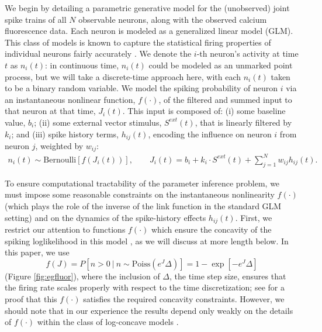 \documentclass[aoas,preprint]{imsart}
\newcommand{\w}{w}
\begin{document}
We begin by detailing a parametric generative model for the
(unobserved) joint spike trains of all $N$ observable neurons, along
with the observed calcium fluorescence data. Each neuron is modeled as
a generalized linear model (GLM). This class of models is known to
capture the statistical firing properties of individual neurons fairly
accurately
\cite{BRIL88,CSK88,BRIL92,PG00,PAN03d,PAN04c,Rigat06,TRUC05,NYK06,KP06,PILL07,Vidne08,Stevenson2009}. We
denote the $i$-th neuron's activity at time $t$ as $n_i(t)$: in
continuous time, $n_i(t)$ could be modeled as an unmarked point
process, but we will take a discrete-time approach here, with each
$n_i(t)$ taken to be a binary random variable. We model the spiking
probability of neuron $i$ via an instantaneous nonlinear function,
$f(\cdot)$, of the filtered and summed input to that neuron at that
time, $J_i(t)$. This input is composed of: (i) some baseline value,
$b_i$; (ii) some external vector stimulus, $S^{ext}(t)$, that is
linearly filtered by $k_i$; and (iii) spike history terms,
$h_{ij}(t)$, encoding the influence on neuron $i$ from neuron $j$,
weighted by $\w_{ij}$:
\begin{equation} \label{eqn:glm:definition}
\begin{array}{l}
n_i(t) \sim \text{Bernoulli}\left[f\left(J_i(t) \right) \right], \qquad
J_i(t)=b_i+k_i\cdot S^{ext}(t)+\sum \limits_{j=1}^{N} \w_{ij} h_{ij}(t).
\end{array}
\end{equation}

To ensure computational tractability of the parameter inference
problem, we must impose some reasonable constraints on the
instantaneous nonlinearity $f(\cdot)$ (which plays the role of the
inverse of the link function in the standard GLM setting) and on the
dynamics of the spike-history effects $h_{ij}(t)$. First, we restrict
our attention to functions $f(\cdot)$ which ensure the concavity of
the spiking loglikelihood in this model \cite{PAN04c,Escola07}, as we
will discuss at more length below. In this paper, we use
\begin{equation}
f(J) = P\left[n>0 ~|~ n \sim \text{Poiss}\left(e^J\Delta\right)\right] = 1 - \exp[-e^J \Delta]
\end{equation}
(Figure \ref{fig:egfluor}), where the inclusion of $\Delta$, the time step size, ensures that the firing rate scales properly with respect to the time discretization; see \cite{Escola07} for a proof that this $f(\cdot)$ satisfies the required concavity constraints. However, we should note that in our experience the results depend only weakly on the details of $f(\cdot)$ within the class of log-concave models \cite{LD89,PAN04c}.
\end{document}
